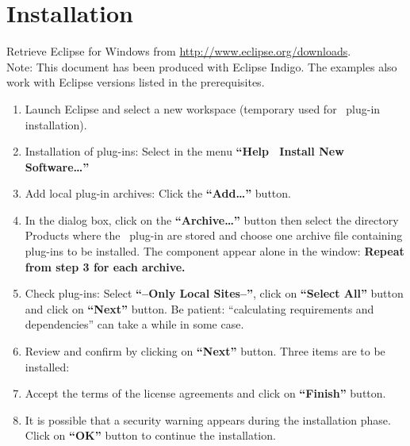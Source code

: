 \chapter{Installation}

Retrieve Eclipse for Windows from \href{http://www.eclipse.org/downloads}{http://www.eclipse.org/downloads}.\\
Note: This document has been produced with Eclipse Indigo. The examples also work with Eclipse versions listed in the prerequisites.
\\

\begin{enumerate}
\item Launch Eclipse and select a new workspace (temporary used for \mxproduct~plug-in installation).

\item Installation of plug-ins: Select in the menu \textbf{``Help \RHD~Install New Software\dots ''}

\item Add local plug-in archives: Click the \textbf{``Add\dots ''} button.


\item In the dialog box, click on the \textbf{``Archive\dots ''} button then select the directory Products where the \mxproduct~plug-in are stored and choose one archive file containing plug-ins to be installed.
The component appear alone in the window:
\textbf{Repeat from step 3 for each archive.}

\item Check plug-ins: Select \textbf{``--Only Local Sites--''}, click on \textbf{``Select All''} button and click on \textbf{``Next''} button.
Be patient: ``calculating requirements and dependencies'' can take a while in some case.

\item Review and confirm by clicking on \textbf{``Next''} button. Three items are to be installed:

\item Accept the terms of the license agreements and click on \textbf{``Finish''} button.

\item It is possible that a security warning appears during the installation phase. Click on \textbf{``OK''} button to continue the installation.


\end{enumerate}
